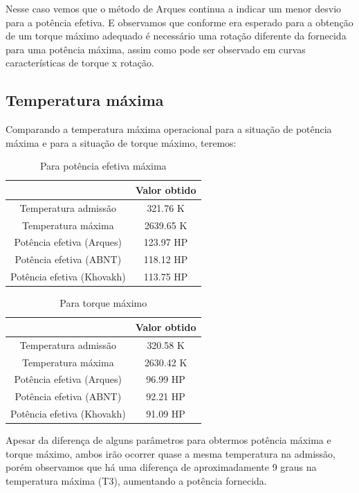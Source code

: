 \documentclass[a4paper]{article}
\begin{document}
Nesse caso vemos que o método de Arques continua a indicar um menor desvio para a potência efetiva. E observamos que conforme era esperado para a obtenção de um torque máximo adequado é necessário uma rotação diferente da fornecida para uma potência máxima, assim como pode ser observado em curvas características de torque x rotação.

\subsection{Temperatura máxima}
Comparando a temperatura máxima operacional para a situação de potência máxima e para a situação de torque máximo, teremos:
\begin{table}[!htb]
    \centering
    \begin{tabular}{|c|c|}
    \hline
     & Valor obtido\\
    \hline
    Temperatura admissão & 321.76 K\\
    \hline
    Temperatura máxima & 2639.65 K\\
    \hline
    Potência efetiva (Arques) & 123.97 HP\\
    \hline
    Potência efetiva (ABNT) & 118.12 HP\\
    \hline
    Potência efetiva (Khovakh) & 113.75 HP\\
    \hline
    \end{tabular}
    \caption{Para potência efetiva máxima}
\end{table}
\newpage
\begin{table}[!htb]
    \centering
    \begin{tabular}{|c|c|}
    \hline
    & Valor obtido\\
    \hline
    Temperatura admissão & 320.58 K\\
    \hline
    Temperatura máxima & 2630.42 K\\
    \hline
    Potência efetiva (Arques) & 96.99 HP\\
    \hline
    Potência efetiva (ABNT) & 92.21 HP\\
    \hline
    Potência efetiva (Khovakh) & 91.09 HP\\
    \hline
    \end{tabular}
    \caption{Para torque máximo}
\end{table}
Apesar da diferença de alguns parâmetros para obtermos potência máxima e torque máximo, ambos irão ocorrer quase a mesma temperatura na admissão, porém observamos que há uma diferença de aproximadamente 9 graus na temperatura máxima (T3), aumentando a potência fornecida.
\end{document}
